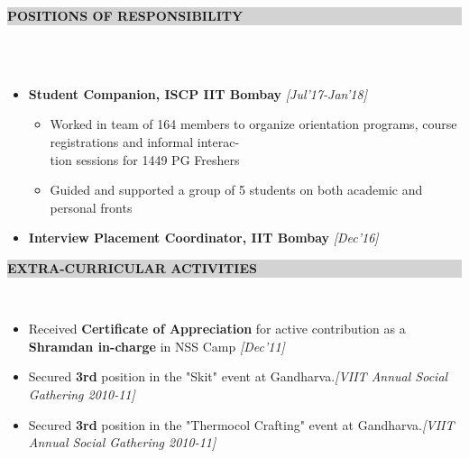 \documentclass[a4paper,10pt]{article}
\newcommand{\lsep}{-0.5cm}
\newcommand{\hsep}{-0.6cm}
\newcommand{\resheading}[1]{{\small \colorbox{lightgray}{\begin{minipage}{1\textwidth}{\textbf{#1 \vphantom{p\^{E}}}}\end{minipage}}}}
\begin{document}
\hspace{-0.5cm}
\resheading{\textbf{\large  POSITIONS OF RESPONSIBILITY}}\\[\lsep] 
\\[-0.4cm]
\begin{itemize}
         \item \textbf{Student Companion, ISCP IIT Bombay} \hfill\emph{[Jul'17-Jan'18]} \\[\hsep]
		\begin{itemize}
        	\item \noindent Worked in team of 164 members to organize orientation programs, course registrations and informal interac-\\[-0.05cm]tion sessions for 1449 PG Freshers\\[\hsep]
        	\item Guided and supported a group of 5 students on both academic and personal fronts\\[-0.7cm]
     	\end{itemize}
     	\item \textbf{Interview Placement Coordinator, IIT Bombay} \hfill\emph{[Dec'16]}\\[-0.5cm]
	
\end{itemize}

\hspace{-0.5cm}
\resheading{\textbf{\large EXTRA-CURRICULAR ACTIVITIES}}\\ [\lsep]
\begin{itemize}
         \item Received \textbf{Certificate of Appreciation} for active contribution as a \textbf{Shramdan in-charge} in NSS Camp \hfill\emph{[Dec'11]} \\[-0.7cm]
         \item Secured \textbf{3rd} position in the "Skit" event at Gandharva.\hfill\emph{[VIIT Annual Social Gathering 2010-11]} \\[-0.7cm]
         \item Secured \textbf{3rd} position in the "Thermocol Crafting"  event at Gandharva.\hfill\emph{[VIIT Annual Social Gathering 2010-11]} \\ [-0.7cm]
\end{itemize}
\end{document}

